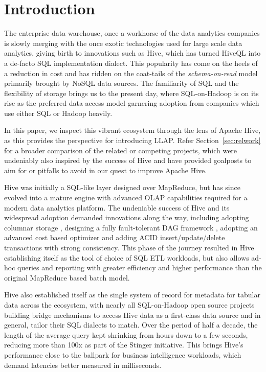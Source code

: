 \section{Introduction}

The enterprise data warehouse, once a workhorse of the data analytics companies is slowly merging with the once exotic technologies used for large scale data analytics, giving birth to innovations such as Hive, which has turned HiveQL into a de-facto SQL implementation dialect. This popularity has come on the heels of a reduction in cost and has ridden on the coat-tails of the \emph{schema-on-read} model primarily brought by NoSQL data sources. The familiarity of SQL and the flexibility of storage brings us to the present day, where SQL-on-Hadoop is on its rise as the preferred data access model garnering adoption from companies which use either SQL or Hadoop heavily.

In this paper, we inspect this vibrant ecosystem through the lens of Apache Hive, as this provides the perspective for introducing LLAP. Refer Section~\ref{sec:relwork} for a broader comparison of the related or competing projects, which were undeniably also inspired by the success of Hive and have provided goalposts to aim for or pitfalls to avoid in our quest to improve Apache Hive. 

Hive was initially a SQL-like layer designed over MapReduce, but has since evolved into a mature engine with advanced OLAP capabilities required for a modern data analytics platform.
The undeniable success of Hive and its widespread adoption demanded innovations along the way, including adopting columnar storage \cite{ORC}, designing a fully fault-tolerant DAG framework \cite{tez}, adopting an advanced cost based optimizer \cite{calcite} and adding ACID insert/update/delete transactions with strong consistency. This phase of the journey resulted in Hive establishing itself as the tool of choice of SQL ETL workloads, but also allows ad-hoc queries and reporting with greater efficiency and higher performance than the original MapReduce based batch model.

Hive also established itself as the single system of record for metadata for tabular data across the ecosystem, with nearly all SQL-on-Hadoop open source projects building bridge mechanisms to access Hive data as a first-class data source and in general, tailor their SQL dialects to match. Over the period of half a decade, the length of the average query kept shrinking from hours down to a few seconds, reducing more than 100x as part of the Stinger\cite{tez} initiative. This brings Hive's performance close to the ballpark for business intelligence workloads, which demand latencies better measured in milliseconds.


